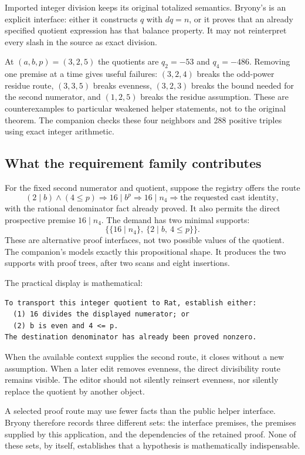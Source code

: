 \documentclass[11pt,a4paper]{article}
\newcommand{\code}[1]{\texttt{\detokenize{#1}}}
\theoremstyle{definition}\newtheorem{definition}[theorem]{Definition}
\theoremstyle{remark}\newtheorem{remark}[theorem]{Remark}
\begin{document}
Imported integer division keeps its original totalized semantics. Bryony's \code{exact_quotient} is an explicit interface: either it constructs $q$ with $dq=n$, or it proves that an already specified quotient expression has that balance property. It may not reinterpret every slash in the source as exact division.

At $(a,b,p)=(3,2,5)$ the quotients are $q_2=-53$ and $q_4=-486$. Removing one premise at a time gives useful failures: $(3,2,4)$ breaks the odd-power residue route, $(3,3,5)$ breaks evenness, $(3,2,3)$ breaks the bound needed for the second numerator, and $(1,2,5)$ breaks the residue assumption. These are counterexamples to particular weakened helper statements, not to the original theorem. The companion checks these four neighbors and 288 positive triples using exact integer arithmetic.

\subsection{What the requirement family contributes}
For the fixed second numerator and quotient, suppose the registry offers the route
\[
 (2\mid b)\wedge(4\le p)\Rightarrow16\mid b^p
 \Rightarrow16\mid n_4\Rightarrow\text{the requested cast identity},
\]
with the rational denominator fact already proved. It also permits the direct prospective premise $16\mid n_4$. The demand has two minimal supports:
\begin{equation}\label{eq:freyfamily}
 \bigl\{\{16\mid n_4\},\ \{2\mid b,\ 4\le p\}\bigr\}.
\end{equation}
These are alternative proof interfaces, not two possible values of the quotient. The companion's \code{frey4.bry} models exactly this propositional shape. It produces the two supports with proof trees, after two scans and eight insertions.

The practical display is mathematical:
\begin{lstlisting}
To transport this integer quotient to Rat, establish either:
  (1) 16 divides the displayed numerator; or
  (2) b is even and 4 <= p.
The destination denominator has already been proved nonzero.
\end{lstlisting}
When the available context supplies the second route, it closes without a new assumption. When a later edit removes evenness, the direct divisibility route remains visible. The editor should not silently reinsert evenness, nor silently replace the quotient by another object.

A selected proof route may use fewer facts than the public helper interface. Bryony therefore records three different sets: the interface premises, the premises supplied by this application, and the dependencies of the retained proof. None of these sets, by itself, establishes that a hypothesis is mathematically indispensable.
\end{document}
